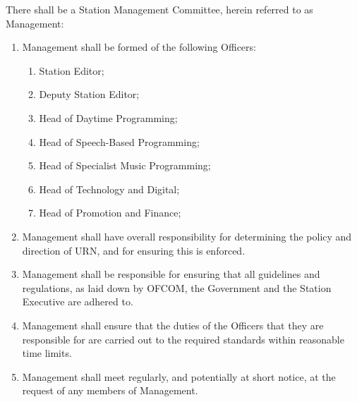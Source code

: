 \item There shall be a Station Management Committee, herein referred to as Management:
\begin{enumerate}[label*=\arabic*.]
    \item Management shall be formed of the following Officers:
          \begin{enumerate}[label*=\arabic*.]
              \item Station Editor;
              \item Deputy Station Editor;
              \item Head of Daytime Programming;
              \item Head of Speech-Based Programming;
              \item Head of Specialist Music Programming;
              \item Head of Technology and Digital;
              \item Head of Promotion and Finance;
          \end{enumerate}
    \item Management shall have overall responsibility for determining the policy and direction of URN, and for ensuring this is enforced.
    \item Management shall be responsible for ensuring that all guidelines and regulations, as laid down by OFCOM, the Government and the Station Executive are adhered to.
    \item Management shall ensure that the duties of the Officers that they are responsible for are carried out to the required standards within reasonable time limits.
    \item Management shall meet regularly, and potentially at short notice, at the request of any members of Management.
\end{enumerate}

